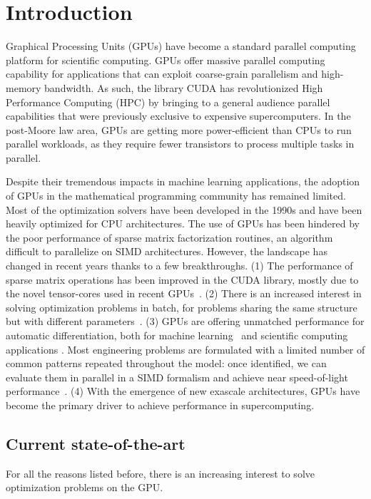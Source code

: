 \section{Introduction}
Graphical Processing Units (GPUs) have become a standard parallel computing platform
for scientific computing.
GPUs offer massive parallel computing capability for applications
that can exploit coarse-grain parallelism and high-memory bandwidth.
As such, the library CUDA has revolutionized High Performance Computing (HPC)
by bringing to a general audience parallel capabilities that were previously
exclusive to expensive supercomputers.
In the post-Moore law area, GPUs
are getting more power-efficient than CPUs to run parallel workloads, as they require
fewer transistors to process multiple tasks in parallel.

Despite their tremendous impacts in machine learning applications, the
adoption of GPUs in the mathematical programming community has
remained limited. Most of the optimization solvers have been developed
in the 1990s and have been heavily optimized for CPU architectures.
The use of GPUs has been hindered by the poor performance of
sparse matrix factorization routines, an algorithm difficult to parallelize
on SIMD architectures. However, the landscape has changed in
recent years thanks to a few breakthroughs.
(1) The performance of sparse matrix operations has been improved
in the CUDA library, mostly due to the novel tensor-cores used
in recent GPUs~\cite{markidis2018nvidia}.
(2) There is an increased interest in solving optimization
problems in batch, for problems sharing the same
structure but with different parameters~\cite{amos2017optnet,pineda2022theseus}.
(3) GPUs are offering unmatched performance for automatic differentiation,
both for machine learning~\cite{jax2018github} and scientific computing applications \cite{enzyme2021}.
Most engineering problems are formulated with a limited
number of common patterns repeated throughout the model: once
identified, we can evaluate them in parallel in a SIMD formalism
and achieve near speed-of-light performance~\cite{shin2023accelerating}.
(4) With the emergence of new exascale architectures, 
GPUs have become the primary driver to achieve performance in
supercomputing.

\subsection{Current state-of-the-art}
For all the reasons listed before, there is an increasing interest
to solve optimization problems on the GPU.

